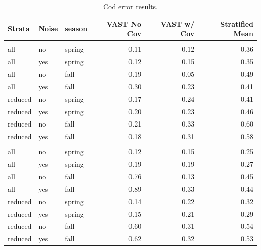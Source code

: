 \documentclass[
  12pt,
]{article}
\begin{document}
\begin{table}

\caption{\label{tab:CodERROR}Cod error results.}
\centering
\fontsize{10}{12}\selectfont
\begin{tabular}[t]{lllrrr}
\toprule
Strata & Noise & season & VAST No Cov & VAST w/ Cov & Stratified Mean\\
\midrule
\addlinespace[0.3em]
\multicolumn{1}{l}{\textbf{constant}}\\
\hspace{1em}all & no & spring & 0.11 & 0.12 & 0.36\\
\hspace{1em}all & yes & spring & 0.12 & 0.15 & 0.35\\
\hspace{1em}all & no & fall & 0.19 & 0.05 & 0.49\\
\hspace{1em}all & yes & fall & 0.30 & 0.23 & 0.41\\
\hspace{1em}reduced & no & spring & 0.17 & 0.24 & 0.41\\
\hspace{1em}reduced & yes & spring & 0.20 & 0.23 & 0.46\\
\hspace{1em}reduced & no & fall & 0.21 & 0.33 & 0.60\\
\hspace{1em}reduced & yes & fall & 0.18 & 0.31 & 0.58\\
\addlinespace[0.3em]
\multicolumn{1}{l}{\textbf{increasing}}\\
\hspace{1em}all & no & spring & 0.12 & 0.15 & 0.25\\
\hspace{1em}all & yes & spring & 0.19 & 0.19 & 0.27\\
\hspace{1em}all & no & fall & 0.76 & 0.13 & 0.45\\
\hspace{1em}all & yes & fall & 0.89 & 0.33 & 0.44\\
\hspace{1em}reduced & no & spring & 0.14 & 0.22 & 0.32\\
\hspace{1em}reduced & yes & spring & 0.15 & 0.21 & 0.29\\
\hspace{1em}reduced & no & fall & 0.60 & 0.31 & 0.54\\
\hspace{1em}reduced & yes & fall & 0.62 & 0.32 & 0.53\\
\bottomrule
\end{tabular}
\end{table}
\end{document}
